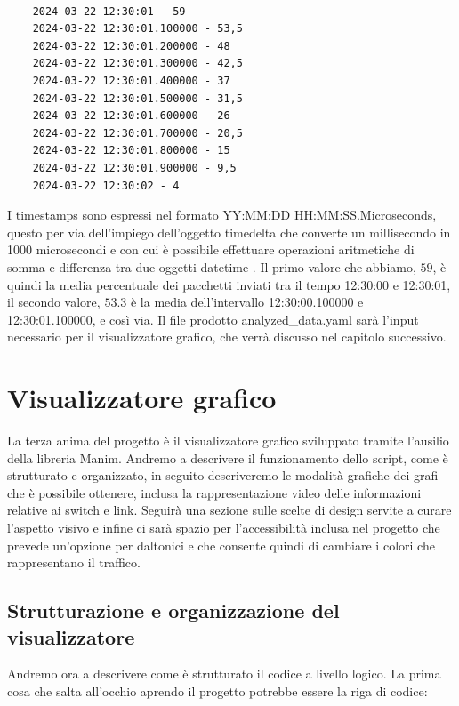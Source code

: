 \documentclass[binding=0.6cm]{sapthesis}
\begin{document}
{\scriptsize %
\begin{lstlisting}[caption={Timestamps e medie percentuali calcolate dall'analizzatore}, label={codice:analyzed_data_structure}]

    2024-03-22 12:30:01 - 59
    2024-03-22 12:30:01.100000 - 53,5
    2024-03-22 12:30:01.200000 - 48
    2024-03-22 12:30:01.300000 - 42,5
    2024-03-22 12:30:01.400000 - 37
    2024-03-22 12:30:01.500000 - 31,5
    2024-03-22 12:30:01.600000 - 26
    2024-03-22 12:30:01.700000 - 20,5
    2024-03-22 12:30:01.800000 - 15
    2024-03-22 12:30:01.900000 - 9,5
    2024-03-22 12:30:02 - 4

\end{lstlisting}
}
I timestamps sono espressi nel formato YY:MM:DD HH:MM:SS.Microseconds, questo per via dell'impiego dell'oggetto timedelta \cite{pythonDatetimeTimedelta} che converte un millisecondo in 1000 microsecondi e con cui è possibile effettuare
operazioni aritmetiche di somma e differenza tra due oggetti datetime \cite{pythonDatetimeTimedelta}.
Il primo valore che abbiamo, \(59\), è quindi la media percentuale dei pacchetti inviati tra il tempo 12:30:00 e 12:30:01, il secondo valore, \(53.3\) è la media
dell'intervallo 12:30:00.100000 e 12:30:01.100000, e così via.
Il file prodotto analyzed\_data.yaml sarà l'input necessario per il visualizzatore grafico, che verrà discusso nel capitolo successivo.

\chapter{Visualizzatore grafico}
La terza anima del progetto è il visualizzatore grafico sviluppato tramite l'ausilio della libreria Manim. Andremo a descrivere il funzionamento dello script,
come è strutturato e organizzato, in seguito descriveremo le modalità grafiche dei grafi che è possibile ottenere, inclusa la rappresentazione video
delle informazioni relative ai switch e link. Seguirà una sezione sulle scelte di design servite a curare l'aspetto visivo e infine ci sarà spazio
per l'accessibilità inclusa nel progetto che prevede un'opzione per daltonici e che consente quindi di cambiare i colori che rappresentano il traffico.

\section{Strutturazione e organizzazione del visualizzatore}
\label{sec:strutturazione_visualizzatore}
Andremo ora a descrivere come è strutturato il codice a livello logico. La prima cosa che salta all'occhio aprendo il progetto potrebbe essere la riga di codice:
\end{document}
